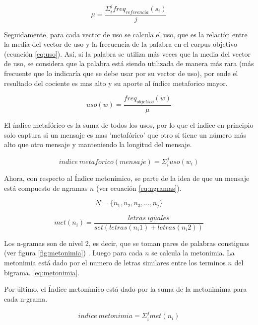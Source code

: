 \documentclass[12pt,letterpaper,twoside]{article}
\begin{document}
\begin{equation}\label{eq:uso}
\mu = \frac{\Sigma_i^jfreq_{referencia}(s_i)}{j}
\end{equation}


Seguidamente, para cada vector de uso se calcula el uso, que es la
relación entre la media del vector de uso y la frecuencia de la
palabra en el corpus objetivo (ecuación \ref{eq:uso}). Así, si la
palabra se utiliza más veces que la media del vector de uso, se
considera que la palabra está siendo utilizada de manera más rara (más
frecuente que lo indicaría que se debe usar por su vector de uso), por
ende el resultado del cociente es mas alto y su aporte al índice
metaforico mayor.

\begin{equation}\label{eq:uso}
uso(w) = \frac{freq_{objetivo}(w)}{\mu}
\end{equation}



 El índice metafórico es la suma de todos los usos, por lo que el
índice en principio solo captura si un mensaje es mas 'metafórico' que
otro si tiene un número más alto que otro mensaje y manteniendo la
longitud del mensaje.


\begin{equation}\label{eq:indice_metafórico}
indice\ metaforico(mensaje) =  \Sigma_i^j uso(w_i)
\end{equation}


Ahora, con respecto al Índice metonímico, se parte de la idea de que
un mensaje está compuesto de ngramas \(n\) (ver ecuación
\ref{eq:ngramas}).


\begin{equation}\label{eq:ngramas}
N = \{n_1, n_2, n_3, \dots , n_j\}
\end{equation}

\begin{equation}\label{eq:metonimia}
met(n_i) = \frac{letras\ iguales}{ set(letras(n_i1) + letras(n_i2))}
\end{equation}

Los n-gramas son de nivel 2, es decir, que se toman pares de palabras
constiguas (ver figura \ref{fig:metonimia}) .  Luego para cada \(n\) se
calcula la metonimia. La metonimia está dado por el numero de letras
similares entre los terminos \(n\) del bigrama.  \ref{eq:metonimia}.


Por último, el Índice metonímico está dado por la
suma de la metonimima para cada n-grama.


\begin{equation}\label{eq:indice_metonimia}
indice\ metonimia = \Sigma_i^j met(n_i)
\end{equation}
\end{document}
